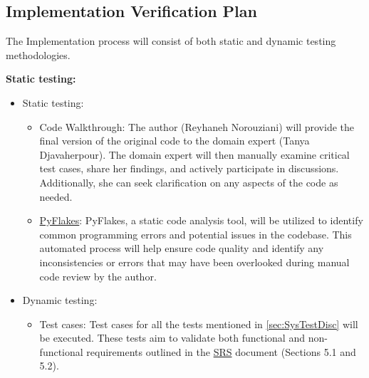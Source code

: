 \documentclass[12pt, titlepage]{article}
\begin{document}
\subsection{Implementation Verification Plan}

The Implementation process will consist of both static and dynamic testing methodologies.

\textbf{Static testing:}
\begin{itemize}

\item Static testing:
\begin{itemize}
\item Code Walkthrough: The author (Reyhaneh Norouziani) will provide the final version of the original code to the domain expert (Tanya Djavaherpour). The domain expert will then manually examine critical test cases, share her findings, and actively participate in discussions. Additionally, she can seek clarification on any aspects of the code as needed.
\item \href{https://pypi.org/project/pyflakes/}{PyFlakes}: PyFlakes, a static code analysis tool, will be utilized to identify common programming errors and potential issues in the \progname{} codebase. This automated process will help ensure code quality and identify any inconsistencies or errors that may have been overlooked during manual code review by the author.
\end{itemize}
\end{itemize}

\begin{itemize}
\item Dynamic testing:
\begin{itemize}

\item Test cases: Test cases for all the tests mentioned in \autoref{sec:SysTestDisc} will be executed. These tests aim to validate both functional and non-functional requirements outlined in the \href{https://github.com/rnorouziani/Helmholtz-Coil-Current-Calculator-CAS741/blob/main/docs/SRS/SRS.pdf}{SRS} document (Sections 5.1 and 5.2).
\end{itemize}
\end{itemize}
\end{document}
